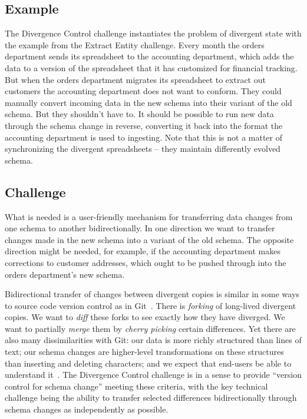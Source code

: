 \documentclass[english,submission]{programming}
\begin{document}
\subsection{Example}
The Divergence Control challenge instantiates the problem of divergent state with the example from the Extract Entity challenge. Every month the orders department sends its spreadsheet to the accounting department, which adds the data to a version of the spreadsheet that it has customized for financial tracking. But when the orders department migrates its spreadsheet to extract out customers the accounting department does not want to conform. They could manually convert incoming data in the new schema into their variant of the old schema. But they shouldn't have to. It should be possible to run new data through the schema change in reverse, converting it back into the format the accounting department is used to ingesting. Note that this is not a matter of synchronizing the divergent spreadsheets -- they maintain differently evolved schema.

\subsection{Challenge}
What is needed is a user-friendly mechanism for transferring data changes from one schema to another bidirectionally. In one direction we want to transfer changes made in the new schema into a variant of the old schema. The opposite direction might be needed, for example, if the accounting department makes corrections to customer addresses, which ought to be pushed through into the orders department's new schema.

Bidirectional transfer of changes between divergent copies is similar in some ways to source code version control as in Git~\cite{ProGit}. There is \textit{forking} of long-lived divergent copies. We want to \textit{diff} these forks to see exactly how they have diverged. We want to partially \textit{merge} them by \textit{cherry picking} certain differences. Yet there are also many dissimilarities with Git: our data is more richly structured than lines of text; our schema changes are higher-level transformations on these structures than inserting and deleting characters; and we expect that end-users be able to understand it~\cite{gitless}. The Divergence Control challenge is in a sense to provide ``version control for schema change'' meeting these criteria, with the key technical challenge being the ability to transfer selected differences bidirectionally through schema changes as independently as possible.
\end{document}
